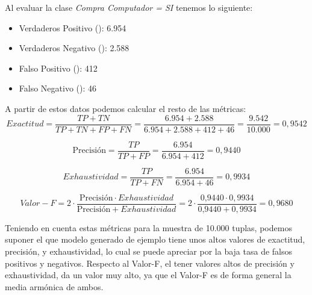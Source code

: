 Al evaluar la clase \textit{Compra Computador = SI} tenemos lo siguiente:

\begin{itemize}
	\item Verdaderos Positivo (): 6.954
	\item Verdaderos Negativo (): 2.588
	\item Falso Positivo (): 412
	\item Falso Negativo (): 46
\end{itemize}

A partir de estos datos podemos calcular el resto de las métricas:
\begin{equation*}
Exactitud = \frac{TP + TN}{TP + TN + FP + FN} = \frac{6.954 + 2.588}{6.954 + 2.588 + 412 + 46} = \frac{9.542}{10.000} = 0,9542
\end{equation*}

\begin{equation*}
\mbox{Precisión} = \frac{TP}{TP + FP} = \frac{6.954}{6.954 + 412} = 0,9440
\end{equation*}

\begin{equation*}
Exhaustividad = \frac{TP}{TP + FN} = \frac{6.954}{6.954 + 46} = 0,9934
\end{equation*}

\begin{equation*}
Valor-F = 2 \cdot \frac{\mbox{Precisión} \cdot Exhaustividad}{\mbox{Precisión} + Exhaustividad} 
		= 2 \cdot \frac{\mbox{0,9440} \cdot 0,9934}{\mbox{0,9440} + 0,9934}
		= 0,9680
\end{equation*}

Teniendo en cuenta estas métricas para la muestra de 10.000 tuplas, podemos suponer el que modelo generado de ejemplo tiene unos altos valores de exactitud, precisión, y exhaustividad, lo cual se puede apreciar por la baja tasa de falsos positivos y negativos. Respecto al Valor-F, el tener valores altos de precisión y exhaustividad, da un valor muy alto, ya que el Valor-F es de forma general la media armónica de ambos.

